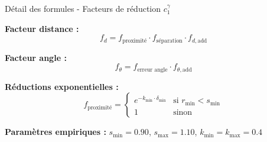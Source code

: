 \begin{frame}{Détail des formules - Facteurs de réduction $c_1^\gamma$}

\textbf{Facteur distance :}
\begin{equation}
f_d = f_{\text{proximité}} \cdot f_{\text{séparation}} \cdot f_{d,\text{add}}
\end{equation}

\textbf{Facteur angle :}
\begin{equation}
f_\theta = f_{\text{erreur angle}} \cdot f_{\theta,\text{add}}
\end{equation}

\textbf{Réductions exponentielles :}
\begin{equation}
f_{\text{proximité}} = \begin{cases}
e^{-k_{\min} \cdot \delta_{\min}} & \text{si } r_{\min} < s_{\min} \\
1 & \text{sinon}
\end{cases}
\end{equation}

\textbf{Paramètres empiriques :} $s_{\min} = 0.90$, $s_{\max} = 1.10$, $k_{\min} = k_{\max} = 0.4$

\end{frame}
